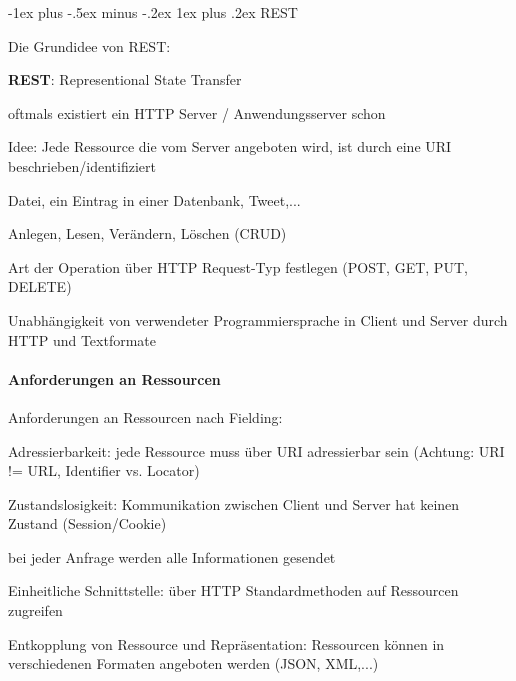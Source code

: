 \documentclass[10pt]{article}
\makeatletter
\renewcommand{\subsubsection}{\@startsection{subsubsection}{3}{0mm}%
                                {-1ex plus -.5ex minus -.2ex}%
                                {1ex plus .2ex}%
                                {\normalfont\small\bfseries}}
\makeatother
\begin{document}
  \subsubsection{REST}
  \begin{itemize*}
    \item Die Grundidee von REST:
    \begin{itemize*}
      \item \textbf{REST}: Representional State Transfer
      \item oftmals existiert ein HTTP Server / Anwendungsserver schon
      \item Idee: Jede Ressource die vom Server angeboten wird, ist durch eine URI beschrieben/identifiziert
      \begin{itemize*}
        \item Datei, ein Eintrag in einer Datenbank, Tweet,...
      \end{itemize*}
      \item Anlegen, Lesen, Verändern, Löschen (CRUD)
      \begin{itemize*}
        \item Art der Operation über HTTP Request-Typ festlegen (POST, GET, PUT, DELETE)
      \end{itemize*}
      \item Unabhängigkeit von verwendeter Programmiersprache in Client und Server durch HTTP und Textformate
    \end{itemize*}
  \end{itemize*}
  
  \paragraph{Anforderungen an Ressourcen}
  
  Anforderungen an Ressourcen nach Fielding: 
  \begin{enumerate*}
    \item Adressierbarkeit: jede Ressource muss über URI adressierbar sein (Achtung: URI != URL, Identifier vs. Locator)
    \item Zustandslosigkeit: Kommunikation zwischen Client und Server hat keinen Zustand (Session/Cookie)
    \begin{itemize*}
      \item bei jeder Anfrage werden alle Informationen gesendet
    \end{itemize*}
    \item Einheitliche Schnittstelle: über HTTP Standardmethoden auf Ressourcen zugreifen
    \item Entkopplung von Ressource und Repräsentation: Ressourcen können in verschiedenen Formaten angeboten werden (JSON, XML,...)
  \end{enumerate*}
  
\end{document}
